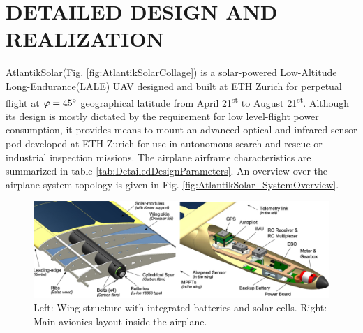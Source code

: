 \section{DETAILED DESIGN AND REALIZATION}\label{sec:detailed_design}

AtlantikSolar(Fig. \ref{fig:AtlantikSolarCollage}) is a solar-powered Low-Altitude Long-Endurance(LALE) UAV designed and built at ETH Zurich for perpetual flight at $\varphi=45\degree$ geographical latitude from April 21\textsuperscript{st} to August 21\textsuperscript{st}. Although its design is mostly dictated by the requirement for low level-flight power consumption, it provides means to mount an advanced optical and infrared sensor pod developed at ETH Zurich for use in autonomous search and rescue or industrial inspection missions. The airplane airframe characteristics are summarized in table \ref{tab:DetailedDesignParameters}. An overview over the airplane system topology is given in Fig. \ref{fig:AtlantikSolar_SystemOverview}.

\begin{figure}[h]
    \centering
    \includegraphics[width=\linewidth]{images/10_CAD_AtlantikSolarAvionics_Combined}
    \caption{Left: Wing structure with integrated batteries and solar cells. Right: Main avionics layout inside the airplane.}
    \label{fig:CAD_AtlantikSolarStructureAndAvionics}
\end{figure}


